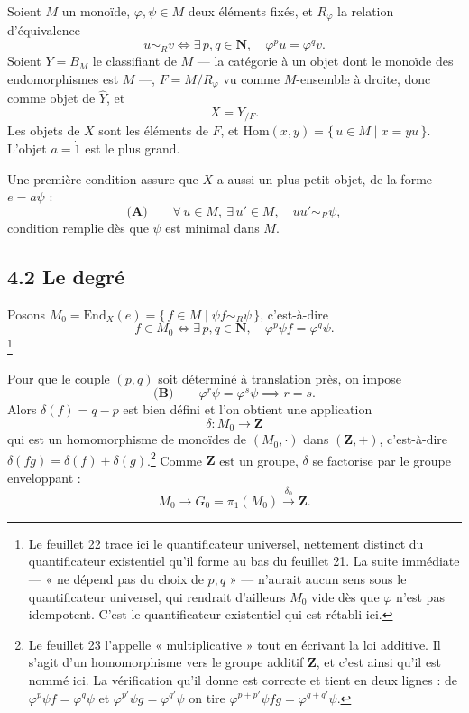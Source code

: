 \documentclass[11pt,a4paper]{article}
\begin{document}
Soient $M$ un monoïde, $\varphi, \psi \in M$ deux éléments fixés, et $R_{\varphi}$
la relation d'équivalence
\[
  u \sim_{R} v \iff \exists\, p, q \in \mathbf{N}, \quad \varphi^{p} u = \varphi^{q} v .
\]
Soient $Y = B_{M}$ le classifiant de $M$ — la catégorie à un objet dont le
monoïde des endomorphismes est $M$ —, $F = M/R_{\varphi}$ vu comme $M$-ensemble
à droite, donc comme objet de $\widehat{Y}$, et
\[
  X = Y_{/F}.
\]
Les objets de $X$ sont les éléments de $F$, et
$\mathrm{Hom}(x,y) = \{\, u \in M \mid x = yu \,\}$. L'objet $a = \dot{1}$ est
le plus grand.

Une première condition assure que $X$ a aussi un plus petit objet, de la forme
$e = a\psi$ :
\[
  \textbf{(A)} \qquad \forall\, u \in M,\ \exists\, u' \in M,
  \quad uu' \sim_{R} \psi ,
\]
condition remplie dès que $\psi$ est minimal dans $M$.

\subsection*{4.2 Le degré}

Posons $M_{0} = \mathrm{End}_{X}(e) = \{\, f \in M \mid \psi f \sim_{R} \psi \,\}$,
c'est-à-dire
\[
  f \in M_{0} \iff \exists\, p, q \in \mathbf{N}, \quad \varphi^{p}\psi f = \varphi^{q}\psi .
\]
\footnote{Le feuillet 22 trace ici le quantificateur universel, nettement
distinct du quantificateur existentiel qu'il forme au bas du feuillet 21. La
suite immédiate — « ne dépend pas du choix de $p,q$ » — n'aurait aucun sens
sous le quantificateur universel, qui rendrait d'ailleurs $M_{0}$ vide dès que
$\varphi$ n'est pas idempotent. C'est le quantificateur existentiel qui est
rétabli ici.}

Pour que le couple $(p,q)$ soit déterminé à translation près, on impose
\[
  \textbf{(B)} \qquad \varphi^{r}\psi = \varphi^{s}\psi \implies r = s .
\]
Alors $\delta(f) = q - p$ est bien défini et l'on obtient une application
\[
  \delta : M_{0} \longrightarrow \mathbf{Z}
\]
qui est un homomorphisme de monoïdes de $(M_{0}, \cdot)$ dans
$(\mathbf{Z}, +)$, c'est-à-dire $\delta(fg) = \delta(f) + \delta(g)$.\footnote{Le
feuillet 23 l'appelle « multiplicative » tout en écrivant la loi additive. Il
s'agit d'un homomorphisme vers le groupe additif $\mathbf{Z}$, et c'est ainsi
qu'il est nommé ici. La vérification qu'il donne est correcte et tient en deux
lignes : de $\varphi^{p}\psi f = \varphi^{q}\psi$ et
$\varphi^{p'}\psi g = \varphi^{q'}\psi$ on tire
$\varphi^{p+p'}\psi fg = \varphi^{q+q'}\psi$.} Comme $\mathbf{Z}$ est un
groupe, $\delta$ se factorise par le groupe enveloppant :
\[
  M_{0} \longrightarrow G_{0} = \pi_{1}(M_{0})
  \xrightarrow{\ \delta_{0}\ } \mathbf{Z}.
\]
\end{document}

